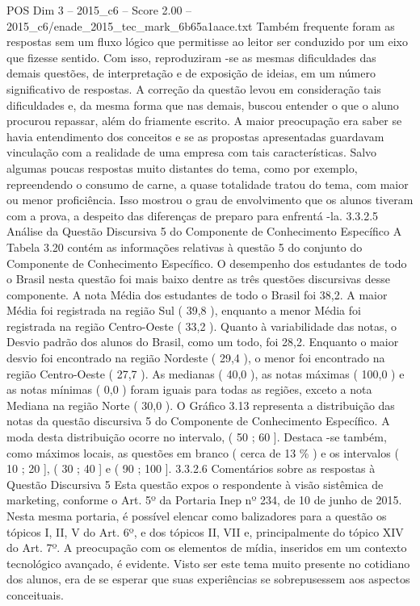 \begin{textsample}{POS Dim 3 – 2015\_c6 – Score 2.00 – 2015\_c6/enade\_2015\_tec\_mark\_6b65a1aace.txt}
Também frequente foram as respostas sem um fluxo lógico que permitisse ao leitor ser conduzido por um eixo que fizesse sentido.
Com isso, reproduziram -se as mesmas dificuldades das demais questões, de interpretação e de exposição de ideias, em um número significativo de respostas.
A correção da questão levou em consideração tais dificuldades e, da mesma forma que nas demais, buscou entender o que o aluno procurou repassar, além do friamente escrito.
A maior preocupação era saber se havia entendimento dos conceitos e se as propostas apresentadas guardavam vinculação com a realidade de uma empresa com tais características.
Salvo algumas poucas respostas muito distantes do tema, como por exemplo, repreendendo o consumo de carne, a quase totalidade tratou do tema, com maior ou menor proficiência.
Isso mostrou o grau de envolvimento que os alunos tiveram com a prova, a despeito das diferenças de preparo para enfrentá -la. 3.3.2.5 Análise da Questão Discursiva 5 do Componente de Conhecimento Específico A Tabela 3.20 contém as informações relativas à questão 5 do conjunto do Componente de Conhecimento Específico.
O desempenho dos estudantes de todo o Brasil nesta questão foi mais baixo dentre as três questões discursivas desse componente.
A nota Média dos estudantes de todo o Brasil foi 38,2.
A maior Média foi registrada na região Sul ( 39,8 ), enquanto a menor Média foi registrada na região Centro-Oeste ( 33,2 ).
Quanto à variabilidade das notas, o Desvio padrão dos alunos do Brasil, como um todo, foi 28,2.
Enquanto o maior desvio foi encontrado na região Nordeste ( 29,4 ), o menor foi encontrado na região Centro-Oeste ( 27,7 ).
As medianas ( 40,0 ), as notas máximas ( 100,0 ) e as notas mínimas ( 0,0 ) foram iguais para todas as regiões, exceto a nota Mediana na região Norte ( 30,0 ).
O Gráfico 3.13 representa a distribuição das notas da questão discursiva 5 do Componente de Conhecimento Específico.
A moda desta distribuição ocorre no intervalo, ( 50 ; 60 ].
Destaca -se também, como máximos locais, as questões em branco ( cerca de 13 \% ) e os intervalos ( 10 ; 20 ], ( 30 ; 40 ] e ( 90 ; 100 ]. 3.3.2.6 Comentários sobre as respostas à Questão Discursiva 5 Esta questão expos o respondente à visão sistêmica de marketing, conforme o Art. 5º da Portaria Inep nº 234, de 10 de junho de 2015.
Nesta mesma portaria, é possível elencar como balizadores para a questão os tópicos I, II, V do Art. 6º, e dos tópicos II, VII e, principalmente do tópico XIV do Art. 7º.
A preocupação com os elementos de mídia, inseridos em um contexto tecnológico avançado, é evidente.
Visto ser este tema muito presente no cotidiano dos alunos, era de se esperar que suas experiências se sobrepusessem aos aspectos conceituais.

\end{textsample}
